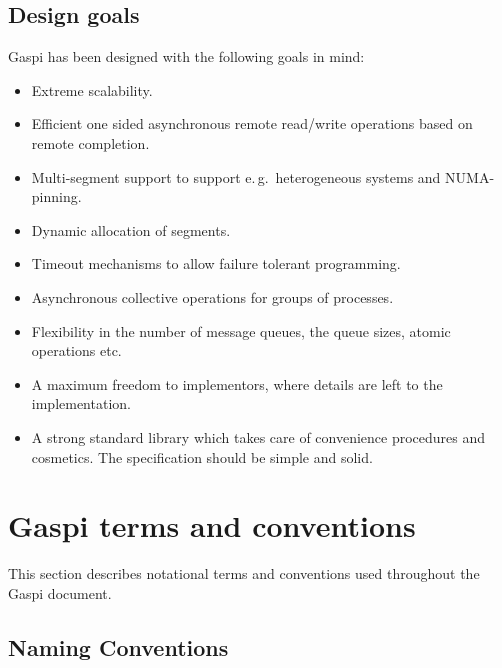 \documentclass[a4paper]{article}
\newlength{\st}\setlength{\st}{0pt}
\newcommand{\GASPI}{{\sc Gaspi}}
\newcommand{\eg}{e.\,g.\ }
\begin{document}
\subsection{Design goals}

\GASPI{} has been designed with the following goals in mind:

\begin{itemize}
\item Extreme scalability.
\item Efficient one sided asynchronous remote read/write operations based on remote completion.
\item Multi-segment support to support \eg heterogeneous systems and NUMA-pinning.
\item Dynamic allocation of segments.
\item Timeout mechanisms to allow failure tolerant programming.
\item Asynchronous collective operations for groups of processes.
\item Flexibility in the number of message queues, the queue sizes, atomic
  operations etc.
\item A maximum freedom to implementors, where details are left to the
  implementation.
\item A strong standard library which takes care of convenience
  procedures and cosmetics. The specification should be simple and solid.
\end{itemize}


\section{\GASPI{} terms and conventions}

This section describes notational terms and conventions used throughout the \GASPI{}
document.


\subsection{Naming Conventions}
\end{document}
